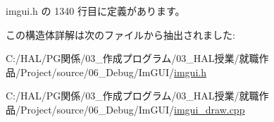  imgui.\+h の 1340 行目に定義があります。



この構造体詳解は次のファイルから抽出されました\+:\begin{DoxyCompactItemize}
\item 
C\+:/\+H\+A\+L/\+P\+G関係/03\+\_\+作成プログラム/03\+\_\+\+H\+A\+L授業/就職作品/\+Project/source/06\+\_\+\+Debug/\+Im\+G\+U\+I/\mbox{\hyperlink{imgui_8h}{imgui.\+h}}\item 
C\+:/\+H\+A\+L/\+P\+G関係/03\+\_\+作成プログラム/03\+\_\+\+H\+A\+L授業/就職作品/\+Project/source/06\+\_\+\+Debug/\+Im\+G\+U\+I/\mbox{\hyperlink{imgui__draw_8cpp}{imgui\+\_\+draw.\+cpp}}\end{DoxyCompactItemize}
